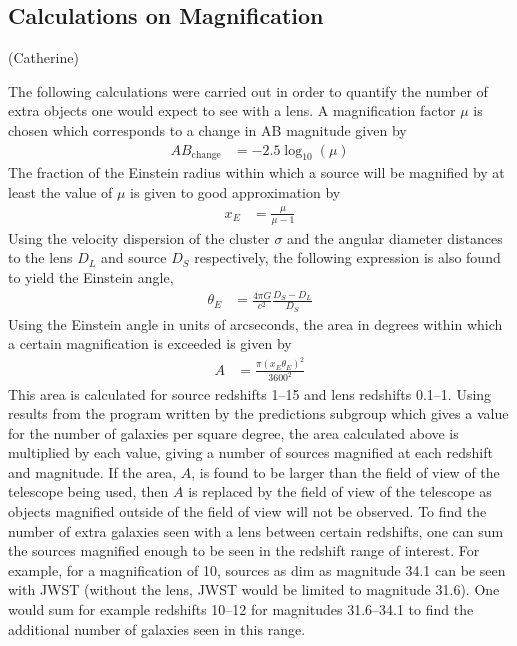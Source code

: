 
\subsection{Calculations on Magnification} %
\label{sub:calculations_on_magnification}
(Catherine)

	The following calculations were carried out in order to quantify the number of extra objects one would expect to see with a lens. A magnification factor $\mu$ is chosen which corresponds to a change in AB magnitude given by
	\begin{align}
		AB_\text{change} &= -2.5\log_{10}(\mu)
	\end{align}
	The fraction of the Einstein radius within which a source will be magnified by at least the value of $\mu$ is given to good approximation by\cite{Lens_mass_estimate}
	\begin{align}
		x_E &= \frac{\mu}{\mu -1}
	\end{align}
	Using the velocity dispersion of the cluster $\sigma$ and the angular diameter distances to the lens $D_L$ and source $D_S$ respectively, the following expression is also found to yield the Einstein angle,
	\begin{align}
		\theta_E &= \frac{4\pi G}{c^2}\frac{D_S-D_L}{D_S}
	\end{align}
	Using the Einstein angle in units of arcseconds, the area in degrees within which a certain magnification is exceeded is given by
	\begin{align}
		A &= \frac{\pi(x_E \theta_E)^2}{3600^2}
	\end{align}
	This area is calculated for source redshifts 1--15 and lens redshifts 0.1--1. Using results from the program written by the predictions subgroup which gives a value for the number of galaxies per square degree, the area calculated above is multiplied by each value, giving a number of sources magnified at each redshift and magnitude. If the area, $A$, is found to be larger than the field of view of the telescope being used, then $A$ is replaced by the field of view of the telescope as objects magnified outside of the field of view will not be observed. To find the number of extra galaxies seen with a lens between certain redshifts, one can sum the sources magnified enough to be seen in the redshift range of interest. For example, for a magnification of 10, sources as dim as magnitude 34.1 can be seen with JWST (without the lens, JWST would be limited to magnitude 31.6). One would sum for example redshifts 10--12 for magnitudes 31.6--34.1 to find the additional number of galaxies seen in this range.


